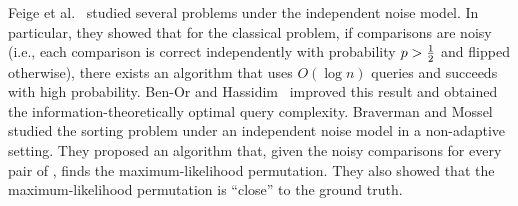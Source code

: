 Feige et al.~\cite{feige-raghavan-peleg-upfal:1994:noisy}
studied several problems under the independent noise model.
In particular, they showed that for the classical \binarysearch problem,
if comparisons are noisy
(i.e., each comparison is correct independently with probability $p > \Half$
and flipped otherwise),
there exists an algorithm that uses $O(\log n)$ queries
and succeeds with high probability.
Ben-Or and Hassidim~\cite{BenOr-hassidim:2008:noisy-binary-search}
improved this result and obtained
the information-theoretically optimal query complexity. 
Braverman and Mossel~\cite{braverman-mossel:2008:noisy-sorting}
studied the sorting problem under an independent noise model
in a non-adaptive setting.
They proposed an algorithm that,
given the noisy comparisons for every pair of \elements,
finds the maximum-likelihood permutation.
They also showed that the maximum-likelihood permutation
is ``close'' to the ground truth.

